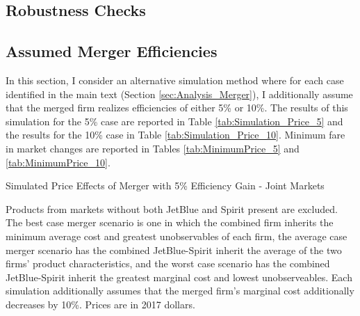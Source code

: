 \documentclass{article}
\begin{document}
\begin{appendices}
    \pagebreak 

    \FloatBarrier
    \section{Robustness Checks}
    \setcounter{table}{0}
    \setcounter{figure}{0}
    \subsection{Assumed Merger Efficiencies}
    \label{App:Efficiencies}
    In this section, I consider an alternative simulation method where for each case identified in the main text (Section \ref{sec:Analysis_Merger}), I additionally assume that the merged firm realizes efficiencies of either 5\% or 10\%. The results of this simulation for the 5\% case are reported in Table \ref{tab:Simulation_Price_5} and the results for the 10\% case in Table \ref{tab:Simulation_Price_10}. Minimum fare in market changes are reported in Tables \ref{tab:MinimumPrice_5} and \ref{tab:MinimumPrice_10}. 

        \begin{table}
        \caption{Simulated Price Effects of Merger with 5\% Efficiency Gain - Joint Markets}
        \label{tab:Simulation_Price_5}
                \vspace{-15mm}
        \begin{center}
         
        \end{center}
        \vspace{-5mm}
        \footnotesize{Products from markets without both JetBlue and Spirit present are excluded. The best case merger scenario is one in which the combined firm inherits the minimum average cost and greatest unobservables of each firm, the average case merger scenario has the combined JetBlue-Spirit inherit the average of the two firms' product characteristics, and the worst case scenario has the combined JetBlue-Spirit inherit the greatest marginal cost and lowest unobserveables. Each simulation additionally assumes that the merged firm's marginal cost additionally decreases by 10\%. Prices are in 2017 dollars.}

     \end{table}


\end{appendices}
\end{document}
